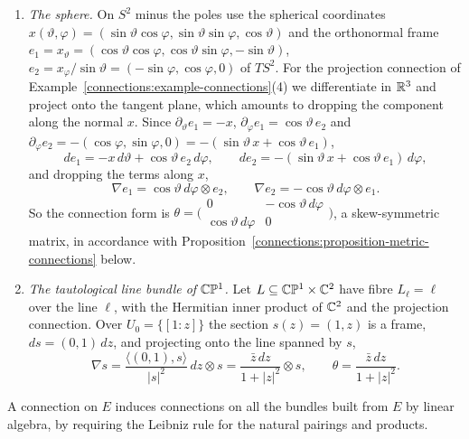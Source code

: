 \begin{example}\label{connections:example-connection-forms}
\begin{enumerate}
\item \emph{The sphere.} On $S^2$ minus the poles use the spherical coordinates $x(\vartheta, \varphi) = (\sin\vartheta\cos\varphi, \sin\vartheta\sin\varphi, \cos\vartheta)$ and the
orthonormal frame $e_1 = x_\vartheta = (\cos\vartheta\cos\varphi, \cos\vartheta\sin\varphi, -\sin\vartheta)$, $e_2 = x_\varphi/\sin\vartheta = (-\sin\varphi, \cos\varphi, 0)$ of $TS^2$.
For the projection connection of Example~\ref{connections:example-connections}(4) we differentiate in $\mathbb{R}^3$ and project onto the tangent plane, which amounts to dropping
the component along the normal $x$. Since $\partial_\vartheta e_1 = -x$, $\partial_\varphi e_1 = \cos\vartheta\,e_2$ and $\partial_\varphi e_2 = -(\cos\varphi, \sin\varphi, 0)
= -(\sin\vartheta\,x + \cos\vartheta\,e_1)$,
\[
de_1 = -x\,d\vartheta + \cos\vartheta\,e_2\,d\varphi, \qquad de_2 = -(\sin\vartheta\,x + \cos\vartheta\,e_1)\,d\varphi,
\]
and dropping the terms along $x$,
\[
\nabla e_1 = \cos\vartheta\,d\varphi \otimes e_2, \qquad \nabla e_2 = -\cos\vartheta\,d\varphi \otimes e_1 .
\]
So the connection form is $\theta = \bigl(\begin{smallmatrix} 0 & -\cos\vartheta\,d\varphi\\ \cos\vartheta\,d\varphi & 0\end{smallmatrix}\bigr)$, a skew-symmetric matrix, in
accordance with Proposition~\ref{connections:proposition-metric-connections} below.
\item \emph{The tautological line bundle of $\mathbb{C}\mathbb{P}^1$.} Let $L \subseteq \mathbb{C}\mathbb{P}^1 \times \mathbb{C}^2$ have fibre $L_\ell = \ell$ over the line $\ell$, with the Hermitian inner product of
$\mathbb{C}^2$ and the projection connection. Over $U_0 = \{[1 : z]\}$ the section $s(z) = (1, z)$ is a frame, $ds = (0, 1)\,dz$, and projecting onto the line spanned by $s$,
\[
\nabla s = \frac{\langle(0, 1), s\rangle}{|s|^2}\,dz \otimes s = \frac{\bar z\,dz}{1 + |z|^2} \otimes s, \qquad \theta = \frac{\bar z\,dz}{1 + |z|^2} .
\]
\end{enumerate}
\end{example}

A connection on $E$ induces connections on all the bundles built from $E$ by linear algebra, by requiring the Leibniz rule for the natural pairings and products.

